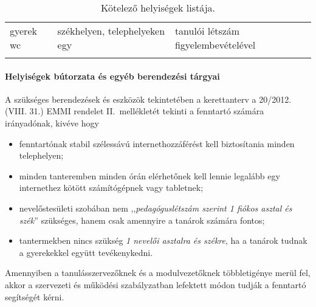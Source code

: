 \begin{longtable}{@{}p{4cm}|p{4cm}|p{6cm}@{}}
    \\ \hline
    gyerek wc                     & székhelyen, telephelyeken egy       &
    tanulói
    létszám figyelembevételével
    \\

    \caption{Kötelező helyiségek listája.}
    \label{tbl:helyisegek}

\end{longtable}

\paragraph{Helyiségek bútorzata és egyéb berendezési tárgyai}

A szükséges
berendezések és eszközök tekintetében a kerettanterv a	20/2012. (VIII. 31.)
EMMI rendelet
II.~mellékletét tekinti a fenntartó számára irányadónak, kivéve hogy
\begin{itemize}
    \item fenntartónak stabil szélessávú internethozzáférést kell
          biztosítania minden telephelyen;
    \item minden tanteremben minden órán elérhetőnek kell lennie legalább egy
          internethez kötött számítógépnek vagy tabletnek;
    \item nevelőstesületi szobában nem ,,\emph{pedagóguslétszám szerint 1
              fiókos
              asztal és szék}'' szükséges, hanem csak amennyire a tanárok
          számára fontos;
    \item tantermekben nincs szükség \emph{1 nevelői asztalra és székre}, ha a
          tanárok tudnak a gyerekekkel együtt tevékenykedni.
\end{itemize}

Amennyiben a tanulásszervezőknek és a modulvezetőknek többletigénye merül fel,
akkor a szervezeti és működési szabályzatban lefektett módon tudják a fenntartó segítségét kérni.